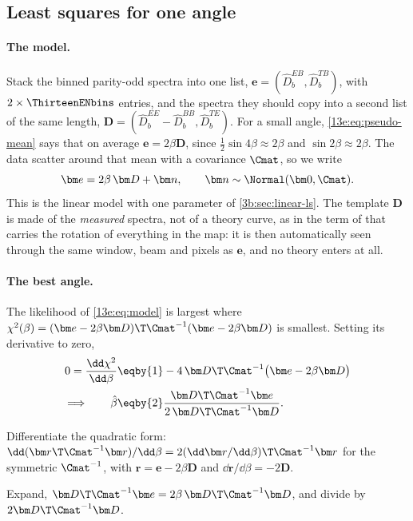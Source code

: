 \subsection{Least squares for one angle}
\label{13e:sec:ls}

\paragraph{The model.} Stack the binned parity-odd spectra into one list, $\bm e=(\widehat D^{EB}_b,\widehat D^{TB}_b)$,
with $2\times\ThirteenENbins$ entries, and the spectra they should copy into a second list of the same length,
$\bm D=(\widehat D^{EE}_b-\widehat D^{BB}_b,\widehat D^{TE}_b)$. For a small angle, \eqref{13e:eq:pseudo-mean}
says that on average $\bm e=2\beta\bm D$, since $\tfrac12\sin4\beta\approx2\beta$ and $\sin2\beta\approx2\beta$. The
data scatter around that mean with a covariance $\Cmat$, so we write
\begin{equation}
  \bm e=2\beta\,\bm D+\bm n,\qquad \bm n\sim\Normal(\bm0,\Cmat).
  \label{13e:eq:model}
\end{equation}
This is the linear model with one parameter of \cref{3b:sec:linear-ls}. The template $\bm D$ is made of the
\emph{measured} spectra, not of a theory curve, as in the term of \cite{MinamiKomatsu2020} that carries the
rotation of everything in the map: it is then automatically seen through the same window, beam and pixels
as $\bm e$, and no theory enters at all.

\paragraph{The best angle.} The likelihood of \eqref{13e:eq:model} is largest where
$\chi^2(\beta)=(\bm e-2\beta\bm D)\T\Cmat^{-1}(\bm e-2\beta\bm D)$ is smallest. Setting its derivative to zero,
\begin{align}
  0=\frac{\dd\chi^2}{\dd\beta}
  &\eqby{1}-4\,\bm D\T\Cmat^{-1}\bigl(\bm e-2\beta\bm D\bigr)
  \nonumber\\
  \Longrightarrow\qquad\hat\beta
  &\eqby{2}\frac{\bm D\T\Cmat^{-1}\bm e}{2\,\bm D\T\Cmat^{-1}\bm D} .
  \label{13e:eq:betahat}
\end{align}
\begin{explain}
  \item Differentiate the quadratic form: $\dd(\bm r\T\Cmat^{-1}\bm r)/\dd\beta=2(\dd\bm r/\dd\beta)\T\Cmat^{-1}\bm r$
        for the symmetric $\Cmat^{-1}$, with $\bm r=\bm e-2\beta\bm D$ and $\dd\bm r/\dd\beta=-2\bm D$.
  \item Expand, $\bm D\T\Cmat^{-1}\bm e=2\beta\,\bm D\T\Cmat^{-1}\bm D$, and divide by $2\bm D\T\Cmat^{-1}\bm D$.
\end{explain}


